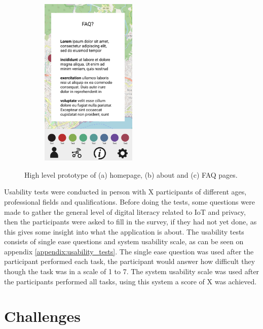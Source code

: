 \begin{figure}
\begin{subfigure}{0.33\textwidth}
        \includegraphics[width=130pt]{../assets/images/low_more_info.png}
        \caption{}
        \label{fig:highfaq}
    \end{subfigure}%
    \caption{High level prototype of (a) homepage, (b) about and (c) FAQ pages.}
    \label{fig:highlevelprototype}
\end{figure}

Usability tests were conducted in person with X participants of different
ages, professional fields and qualifications. Before doing the tests,
some questions were made to gather the general level of digital literacy
related to IoT and privacy, then the participants were asked to fill in the
survey, if they had not yet done, as this gives some insight into what the
application is about. The usability tests consists of single ease questions
and system usability scale, as can be seen on appendix \ref{appendix:usability_tests}.
The single ease question was used after the participant performed each task, the
participant would answer how difficult they though the task was in a
scale of 1 to 7. The system usability scale was used after the participants
performed all tasks, using this system a score of X was achieved.

\section{Challenges}

